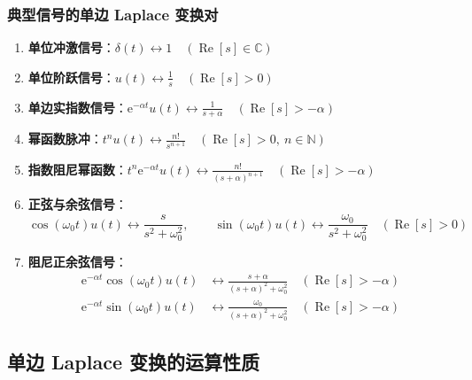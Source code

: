 \documentclass[11pt,a4paper,fontset=fandol]{ctexart}
\theoremstyle{remark}
\begin{document}
\subsubsection{典型信号的单边 Laplace 变换对}
\begin{enumerate}
    \item \textbf{单位冲激信号}：$\delta(t) \longleftrightarrow 1 \quad (\operatorname{Re}[s] \in \mathbb{C})$
    \item \textbf{单位阶跃信号}：$u(t) \longleftrightarrow \frac{1}{s} \quad (\operatorname{Re}[s] > 0)$
    \item \textbf{单边实指数信号}：$\mathrm{e}^{-\alpha t}u(t) \longleftrightarrow \frac{1}{s + \alpha} \quad (\operatorname{Re}[s] > -\alpha)$
    \item \textbf{幂函数脉冲}：$t^n u(t) \longleftrightarrow \frac{n!}{s^{n+1}} \quad (\operatorname{Re}[s] > 0, \ n \in \mathbb{N})$
    \item \textbf{指数阻尼幂函数}：$t^n \mathrm{e}^{-\alpha t}u(t) \longleftrightarrow \frac{n!}{(s + \alpha)^{n+1}} \quad (\operatorname{Re}[s] > -\alpha)$
    \item \textbf{正弦与余弦信号}：
    \begin{equation}
        \cos(\omega_0 t)u(t) \longleftrightarrow \frac{s}{s^2 + \omega_0^2}, \qquad \sin(\omega_0 t)u(t) \longleftrightarrow \frac{\omega_0}{s^2 + \omega_0^2} \quad (\operatorname{Re}[s] > 0)
    \end{equation}
    \item \textbf{阻尼正余弦信号}：
    \begin{align}
        \mathrm{e}^{-\alpha t}\cos(\omega_0 t)u(t) &\longleftrightarrow \frac{s + \alpha}{(s + \alpha)^2 + \omega_0^2} \quad (\operatorname{Re}[s] > -\alpha) \\
        \mathrm{e}^{-\alpha t}\sin(\omega_0 t)u(t) &\longleftrightarrow \frac{\omega_0}{(s + \alpha)^2 + \omega_0^2} \quad (\operatorname{Re}[s] > -\alpha)
    \end{align}
\end{enumerate}

\subsection{单边 Laplace 变换的运算性质}
\end{document}
